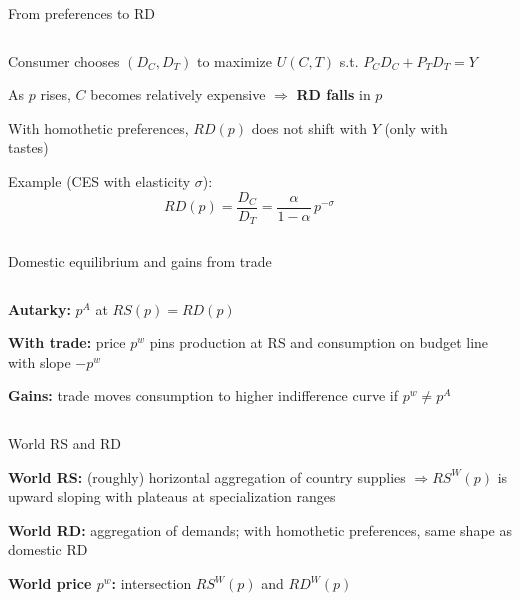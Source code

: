 \documentclass[notes,11pt, aspectratio=169, xcolor=table]{beamer}
\newenvironment{wideitemize}{\itemize\addtolength{\itemsep}{10pt}}{\enditemize}
\begin{document}
\begin{frame}{From preferences to RD}
\begin{columns}[T]
\begin{column}{0.58\textwidth}
\begin{wideitemize}
  \item Consumer chooses $(D_C,D_T)$ to maximize $U(C,T)$ s.t. $P_C D_C + P_T D_T = Y$
  \item As $p$ rises, $C$ becomes relatively expensive $\Rightarrow$ \textbf{RD falls} in $p$
  \item With homothetic preferences, $RD(p)$ does not shift with $Y$ (only with tastes)
  \item Example (CES with elasticity $\sigma$):
  \[
    RD(p)=\frac{D_C}{D_T}
      =\frac{\alpha}{1-\alpha}\,p^{-\sigma}
  \]
\end{wideitemize}
\end{column}
\begin{column}{0.38\textwidth}
\centering
\end{column}
\end{columns}
\end{frame}

\begin{frame}{Domestic equilibrium and gains from trade}
\begin{columns}[T]
\begin{column}{0.58\textwidth}
\begin{wideitemize}
  \item \textbf{Autarky:} $p^A$ at $RS(p)=RD(p)$
  \item \textbf{With trade:} price $p^w$ pins production at RS and consumption on budget line with slope $-p^w$
  \item \textbf{Gains:} trade moves consumption to higher indifference curve if $p^w \neq p^A$
\end{wideitemize}
\end{column}
\begin{column}{0.38\textwidth}
\centering
\end{column}
\end{columns}
\end{frame}

\begin{frame}{World RS and RD}
\begin{wideitemize}
  \item \textbf{World RS:} (roughly) horizontal aggregation of country supplies $\Rightarrow RS^{W}(p)$ is upward sloping with plateaus at specialization ranges
  \item \textbf{World RD:} aggregation of demands; with homothetic preferences, same shape as domestic RD
  \item \textbf{World price $p^w$:} intersection $RS^{W}(p)$ and $RD^{W}(p)$
\end{wideitemize}
\vspace{2mm}
\centering
\end{frame}
\end{document}
